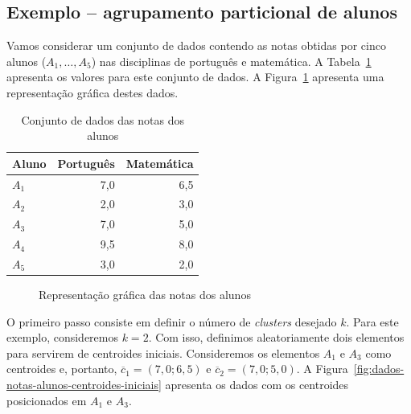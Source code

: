 \subsection{Exemplo -- agrupamento particional de alunos}
\label{sec:exemplo-k-means}

Vamos considerar um conjunto de dados contendo as notas obtidas por cinco alunos ($A_1, \hdots, A_5$) nas disciplinas de português e matemática. A Tabela~\ref{tab:dados-notas-alunos} apresenta os valores para este conjunto de dados. A Figura~\ref{fig:dados-notas-alunos} apresenta uma representação gráfica destes dados.

\begin{table}[h]
	\centering
	
	\begin{tabular}{lrr}
		\hline
		\textbf{Aluno} & \textbf{Português} & \textbf{Matemática} \\
		\hline
		$A_1$ & 7,0 & 6,5 \\
		$A_2$ & 2,0 & 3,0 \\
		$A_3$ & 7,0 & 5,0 \\
		$A_4$ & 9,5 & 8,0 \\
		$A_5$ & 3,0 & 2,0 \\
		\hline
	\end{tabular}
	
	\caption{Conjunto de dados das notas dos alunos}
	\label{tab:dados-notas-alunos}
\end{table}

\begin{figure}[h]
	\centering
	
	
	\caption{Representação gráfica das notas dos alunos}
	\label{fig:dados-notas-alunos}
\end{figure}

O primeiro passo consiste em definir o número de \textit{clusters} desejado $k$. Para este exemplo, consideremos $k = 2$. Com isso, definimos aleatoriamente dois elementos para servirem de centroides iniciais. Consideremos os elementos $A_1$ e $A_3$ como centroides e, portanto, $\overline{c}_1 = (7,0; 6,5)$ e $\overline{c}_2 = (7,0; 5,0)$. A Figura~\ref{fig:dados-notas-alunos-centroides-iniciais} apresenta os dados com os centroides posicionados em $A_1$ e $A_3$.

